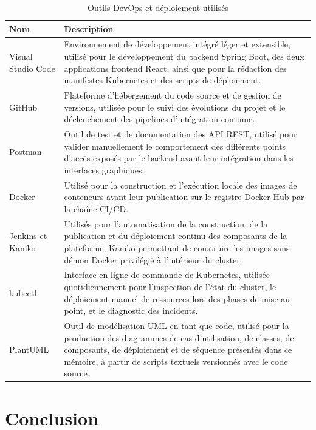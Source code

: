     \begin{table}[H]
    \begin{center}
    \begin{tabular}{|l{3.2cm}|p{10cm}|}
    \hline
    \textbf{Nom} & \textbf{Description} \\
    \hline
    Visual Studio Code & Environnement de développement intégré léger et extensible, utilisé pour le développement du backend Spring Boot, des deux applications frontend React, ainsi que pour la rédaction des manifestes Kubernetes et des scripts de déploiement. \\
    \hline
    GitHub & Plateforme d'hébergement du code source et de gestion de versions, utilisée pour le suivi des évolutions du projet et le déclenchement des pipelines d'intégration continue. \\
    \hline
    Postman & Outil de test et de documentation des API REST, utilisé pour valider manuellement le comportement des différents points d'accès exposés par le backend avant leur intégration dans les interfaces graphiques. \\
    \hline
    Docker & Utilisé pour la construction et l'exécution locale des images de conteneurs avant leur publication sur le registre Docker Hub par la chaîne CI/CD. \\
    \hline
    Jenkins et Kaniko & Utilisés pour l'automatisation de la construction, de la publication et du déploiement continu des composants de la plateforme, Kaniko permettant de construire les images sans démon Docker privilégié à l'intérieur du cluster. \\
    \hline
    kubectl & Interface en ligne de commande de Kubernetes, utilisée quotidiennement pour l'inspection de l'état du cluster, le déploiement manuel de ressources lors des phases de mise au point, et le diagnostic des incidents. \\
    \hline
    PlantUML & Outil de modélisation UML en tant que code, utilisé pour la production des diagrammes de cas d'utilisation, de classes, de composants, de déploiement et de séquence présentés dans ce mémoire, à partir de scripts textuels versionnés avec le code source. \\
    \hline
    \end{tabular}
    \caption{Outils DevOps et déploiement utilisés}
    \label{tab:outils-devops}
    \end{center}
    \end{table}
    
    
    \section{Conclusion}
    
